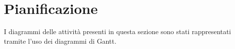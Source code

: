 %


\section{Pianificazione} %
\label{sec:pianificazione}
I diagrammi delle attività presenti in questa sezione sono stati rappresentati tramite l'uso dei diagrammi di Gantt.

